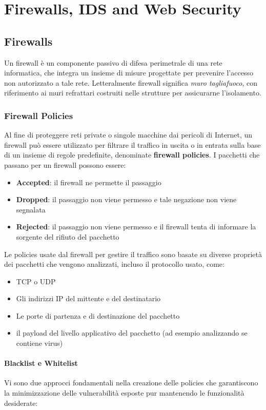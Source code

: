\chapter{Firewalls, IDS and Web Security}
\section{Firewalls}
Un firewall è un componente passivo di difesa perimetrale di una rete informatica, che integra un insieme di misure progettate per prevenire l'accesso non autorizzato a tale rete. Letteralmente firewall significa \textit{muro tagliafuoco}, con riferimento ai muri refrattari costruiti nelle strutture per assicurarne l'isolamento.

\subsection{Firewall Policies}
Al fine di proteggere reti private o singole macchine dai pericoli di Internet, un firewall può essere utilizzato per filtrare il traffico in uscita o in entrata sulla base di un insieme di regole predefinite, denominate \textbf{firewall policies}.
I pacchetti che passano per un firewall possono essere:
\begin{itemize}
\item \textbf{Accepted}: il firewall ne permette il passaggio
\item \textbf{Dropped}: il passaggio non viene permesso e tale negazione non viene segnalata
\item  \textbf{Rejected}: il passaggio non viene permesso e il firewall tenta di informare la sorgente del rifiuto del pacchetto 
\end{itemize}
Le policies usate dal firewall per gestire il traffico sono basate su diverse proprietà dei pacchetti che vengono analizzati, incluso il protocollo usato, come:
\begin{itemize}
\item TCP o UDP
\item Gli indirizzi IP del mittente e del destinatario
\item Le porte di partenza e di destinazione del pacchetto
\item il payload del livello applicativo del pacchetto (ad esempio analizzando se contiene virus)
\end{itemize}
\subsubsection{Blacklist e Whitelist}
Vi sono due approcci fondamentali nella creazione delle policies che garantiscono la minimizzazione delle vulnerabilità esposte pur mantenendo le funzionalità desiderate:

